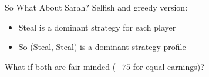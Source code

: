 \begin{frame}{So What About Sarah?}
Selfish and greedy version:\\
\centering
\begin{matrixgame}[top={Split, Steal}, left={Split, Steal}, player names={Sarah, Steven}]
\end{matrixgame}
\bsk
\raggedright
\begin{itemize}
    \item Steal is a \underline{\hspace{1.2in}} dominant strategy for each player
    \item So (Steal, Steal) is a \underline{\hspace{1.2in}} dominant-strategy profile
\end{itemize}
\vfill
What if both are fair-minded ($+75$ for equal earnings)?\\
\centering
\begin{matrixgame}[top={Split, Steal}, left={Split, Steal}, player names={Sarah, Steven}]
\end{matrixgame}
\end{frame}



